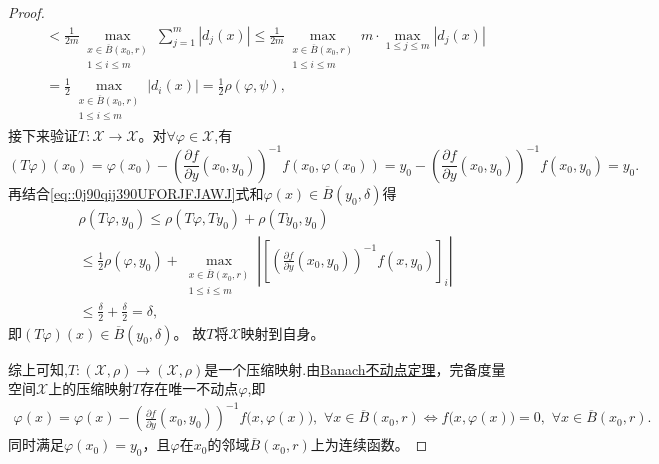 \documentclass[../../main.tex]{subfiles}%
\begin{document}
\begin{proof}
\begin{align}
&<\frac{1}{2m}\max_{\substack{x \in \overline{B}(x_0, r) \\ 1 \leqslant i \leqslant m}}\sum_{j=1}^m{\left| d_j(x) \right|}\leqslant \frac{1}{2m}\max_{\substack{x \in \overline{B}(x_0, r) \\ 1 \leqslant i \leqslant m}}m\cdot \underset{1\leqslant j\leqslant m}{\max}\left| d_j(x) \right|
\nonumber \\
&= \frac{1}{2} \max_{\substack{x \in \overline{B}(x_0, r) \\ 1 \leqslant i \leqslant m}} |d_i(x)| = \frac{1}{2} \rho(\varphi, \psi),
\label{1.1.11}
\end{align}
接下来验证$T:\mathcal{X}\to\mathcal{X}$。对$\forall \varphi \in \mathcal{X}$,有
\[
(T\varphi)(x_0) = \varphi(x_0) - \left( \frac{\partial f}{\partial y}(x_0, y_0) \right)^{-1} f(x_0, \varphi(x_0)) = y_0 - \left( \frac{\partial f}{\partial y}(x_0, y_0) \right)^{-1} f(x_0, y_0) = y_0.
\]
再结合\eqref{eq::0j90qij390UFORJFJAWJ}式和$\varphi(x)\in \overline{B}(y_0,\delta)$得
\begin{align*}
&\rho(T\varphi, y_0) \leqslant \rho(T\varphi, T y_0) + \rho(T y_0, y_0) \\
&\leqslant \frac{1}{2} \rho(\varphi, y_0) + \max_{\substack{x \in \overline{B}(x_0, r) \\ 1 \leqslant i \leqslant m}} \left| \left[ \left( \frac{\partial f}{\partial y}(x_0, y_0) \right)^{-1} f(x, y_0) \right]_i \right|
\\
&\leqslant \frac{\delta}{2}+\frac{\delta}{2}=\delta,
\end{align*}
即$(T\varphi)(x)\in\overline{B}(y_0,\delta)$。
故$T$将$\mathcal{X}$映射到自身。

综上可知,$T:(\mathcal{X},\rho)\to (\mathcal{X},\rho)$是一个压缩映射.由\hyperref[theorem:Banach不动点定理——压缩映象原理]{Banach不动点定理}，完备度量空间$\mathcal{X}$上的压缩映射$T$存在唯一不动点$\varphi$,即
\begin{align*}
\varphi(x)=\varphi(x)-\left( \frac{\partial f}{\partial y}(x_0, y_0) \right)^{-1}f\big(x,\varphi(x)\big),\,\,\forall x\in\overline{B}(x_0,r)\iff f\big(x,\varphi(x)\big)=0,\,\,\forall x\in\overline{B}(x_0,r).
\end{align*}
同时满足$\varphi(x_0)=y_0$，且$\varphi$在$x_0$的邻域$\overline{B}(x_0,r)$上为连续函数。

\end{proof}
\end{document}
